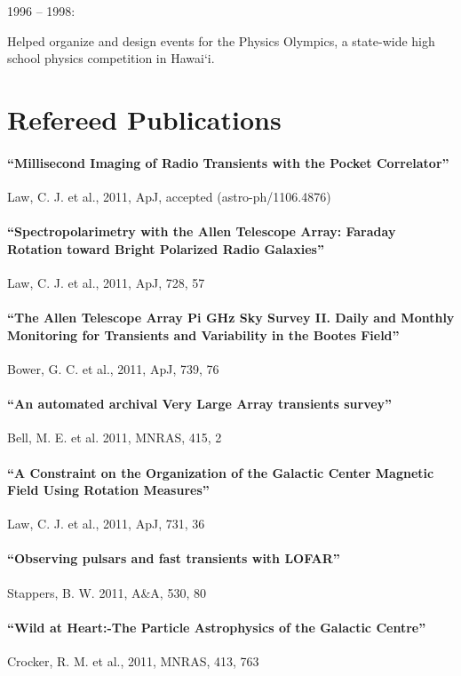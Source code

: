 \documentclass[12pt]{article}
\begin{document}
\begin{bf}1996 -- 1998:  \end{bf}Helped organize and design events for the Physics Olympics, a state-wide high school physics competition in Hawai`i.

\section{Refereed Publications}

\paragraph{``Millisecond Imaging of Radio Transients with the Pocket Correlator''} Law, C. J. et al., 2011, ApJ, accepted (astro-ph/1106.4876)

\paragraph{``Spectropolarimetry with the Allen Telescope Array:  Faraday Rotation toward Bright Polarized Radio Galaxies''} Law, C. J. et al., 2011, ApJ, 728, 57

\paragraph{``The Allen Telescope Array Pi GHz Sky Survey II. Daily and Monthly Monitoring for Transients and Variability in the Bootes Field''} Bower, G. C. et al., 2011, ApJ, 739, 76

\paragraph{``An automated archival Very Large Array transients survey''} Bell, M. E. et al. 2011, MNRAS, 415, 2

\paragraph{``A Constraint on the Organization of the Galactic Center Magnetic Field Using Rotation Measures''} Law, C. J. et al., 2011, ApJ, 731, 36

\paragraph{``Observing pulsars and fast transients with LOFAR''} Stappers, B. W. 2011, A\&A, 530, 80

\paragraph{``Wild at Heart:-The Particle Astrophysics of the Galactic Centre''} Crocker, R. M. et al., 2011, MNRAS, 413, 763
\end{document}
